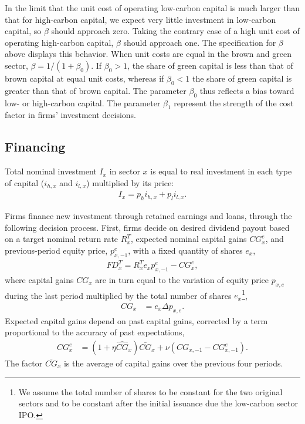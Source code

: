 \documentclass[authoryear]{article}
\begin{document}
In the limit that the unit cost of operating low-carbon capital is much larger than that for high-carbon capital, we expect very little investment in low-carbon capital, so $\beta$ should approach zero. Taking the contrary case of a high unit cost of operating high-carbon capital, $\beta$ should approach one. The specification for $\beta$ above displays this behavior. When unit costs are equal in the brown and green sector, $\beta = 1/(1 + \beta_0)$. If $\beta_0 > 1$, the share of green capital is less than that of brown capital at equal unit costs, whereas if $\beta_0 < 1$ the share of green capital is greater than that of brown capital. The parameter $\beta_0$ thus reflects a bias toward low- or high-carbon capital. The parameter $\beta_1$ represent the strength of the cost factor in firms' investment decisions.



\subsection{Financing}
\label{sec:port}
Total nominal investment $I_x$ in sector $x$ is equal to real investment in each type of capital ($i_{h,x}$ and $i_{l,x}$) multiplied by its price:
\begin{align}
I_x = p_h i_{h,x} + p_l i_{l,x}.
\end{align}

Firms finance new investment through retained earnings and loans, through the following decision process. First, firms decide on desired dividend payout based on a target nominal return rate $R_x^T$, expected nominal capital gains $CG_x^e$, and previous-period equity price, $p_{x,-1}^e$, with a fixed quantity of shares $e_x$,
\begin{gather}
FD_x^T = R_x^T e_x p_{x,-1}^e - CG_x^e,
\end{gather}
where capital gains $CG_x$ are in turn equal to the variation of equity price $p_{x,e}$ during the last period multiplied by the total number of shares $e_x$\footnote{We assume the total number of shares to be constant for the two original sectors and to be constant after the initial issuance due the low-carbon sector IPO.},
\begin{align}
CG_x&= e_x \Delta p_{x,e}.
\end{align}
Expected capital gains depend on past capital gains, corrected by a term proportional to the accuracy of past expectations,
\begin{align}
CG_x^e &= \left(1 + \eta\hat{CG}_x\right)\bar{CG}_x + \nu\left(CG_{x,-1} - CG^e_{x,-1}\right). \label{eq:expect}
\end{align}
The factor $\bar{CG}_x$ is the average of capital gains over the previous four periods.
\end{document}
